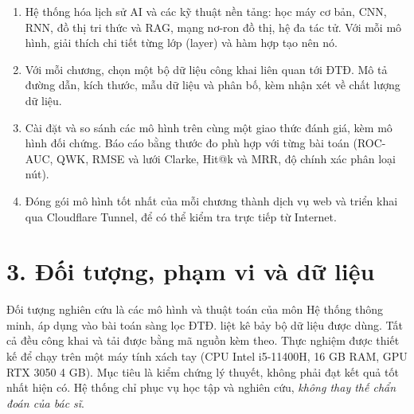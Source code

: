 \begin{enumerate}
  \item Hệ thống hóa lịch sử AI và các kỹ thuật nền tảng: học máy cơ bản, CNN, RNN, đồ thị tri thức và RAG, mạng nơ-ron đồ thị, hệ đa tác tử. Với mỗi mô hình, giải thích chi tiết từng lớp (layer) và hàm hợp tạo nên nó.
  \item Với mỗi chương, chọn một bộ dữ liệu công khai liên quan tới ĐTĐ. Mô tả đường dẫn, kích thước, mẫu dữ liệu và phân bố, kèm nhận xét về chất lượng dữ liệu.
  \item Cài đặt và so sánh các mô hình trên cùng một giao thức đánh giá, kèm mô hình đối chứng. Báo cáo bằng thước đo phù hợp với từng bài toán (ROC-AUC, QWK, RMSE và lưới Clarke, Hit@k và MRR, độ chính xác phân loại nút).
  \item Đóng gói mô hình tốt nhất của mỗi chương thành dịch vụ web và triển khai qua Cloudflare Tunnel, để có thể kiểm tra trực tiếp từ Internet.
\end{enumerate}

\section*{3. Đối tượng, phạm vi và dữ liệu}

Đối tượng nghiên cứu là các mô hình và thuật toán của môn Hệ thống thông minh, áp dụng vào bài toán sàng lọc ĐTĐ.  liệt kê bảy bộ dữ liệu được dùng. Tất cả đều công khai và tải được bằng mã nguồn kèm theo. Thực nghiệm được thiết kế để chạy trên một máy tính xách tay (CPU Intel i5-11400H, 16 GB RAM, GPU RTX 3050 4 GB). Mục tiêu là kiểm chứng lý thuyết, không phải đạt kết quả tốt nhất hiện có. Hệ thống chỉ phục vụ học tập và nghiên cứu, \emph{không thay thế chẩn đoán của bác sĩ}.

